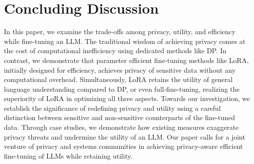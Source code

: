 \section{Concluding Discussion}
\label{sec:conclusion}
In this paper, we examine the  trade-offs among privacy, utility, and efficiency while fine-tuning an LLM. The traditional wisdom of achieving privacy comes at the cost of computational inefficiency using dedicated methods like DP. In contrast, we demonstrate that parameter efficient fine-tuning methods like LoRA, initially designed for efficiency, achieves privacy of sensitive data without any computational overhead. Simultaneously, LoRA retains the utility of general language understanding compared to DP, or even full-fine-tuning, realizing the superiority of LoRA in optimizing all three aspects. Towards our investigation, we  establish the significance of redefining privacy and utility using a careful distinction between sensitive and non-sensitive counterparts of the fine-tuned data. Through case studies, we demonstrate how existing measures exaggerate privacy threats and undermine the utility of an LLM. Our paper calls for a joint venture of   privacy and systems communities in achieving privacy-aware efficient fine-tuning of LLMs while retaining utility.